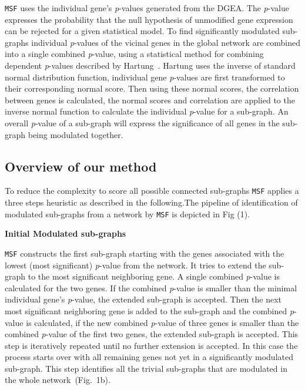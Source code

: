 \documentclass[twocolumn]{article}
\begin{document}
\texttt{MSF} uses the individual gene's \textit{p}-values generated
from the DGEA. The \textit{p}-value
expresses the probability that the null hypothesis of unmodified gene
expression can be rejected for a given statistical model. To find
significantly modulated sub-graphs individual \textit{p}-values of the
vicinal genes in the global network are combined into a single
combined \textit{p}-value, using a statistical method for combining
dependent \textit{p}-values described by Hartung~\cite{Hartung}. Hartung uses the inverse of standard normal distribution function, individual gene \textit{p}-values are
first transformed to their corresponding normal score. Then using these normal scores, the correlation between genes is calculated, the normal scores and correlation are applied to
the inverse normal function to calculate the individual
\textit{p}-value for a sub-graph. An
overall \textit{p}-value of a sub-graph will express the significance
of all genes in the sub-graph being modulated together.



\subsection*{Overview of our method}

To reduce the complexity to score all possible connected sub-graphs
\texttt{MSF} applies a three steps heuristic as described in the
following.The pipeline of identification of modulated sub-graphs from a network by \texttt{MSF} is depicted in
Fig (1).
\newline

\textbf{Initial Modulated sub-graphs}

\texttt{MSF} constructs the first sub-graph starting with the genes
associated with the lowest (most significant) \textit{p}-value from
the network. It tries to extend the
sub-graph to the most significant neighboring gene. A single combined
\textit{p}-value is calculated for the two genes. If the combined
\textit{p}-value is smaller than the minimal individual gene's
\textit{p}-value, the extended sub-graph is accepted. Then the next most significant neighboring gene is added to the sub-graph and the combined \textit{p}-value is calculated, if the new combined \textit{p}-value of three genes is smaller than the combined \textit{p}-value of the first two genes, the extended sub-graph is accepted. This step is iteratively repeated until no further extension is accepted. In this case the process starts over with all remaining genes not yet in a
significantly modulated sub-graph. This step identifies all the trivial
sub-graphs that are modulated in the whole network~(Fig.~1b).\newline
\end{document}
